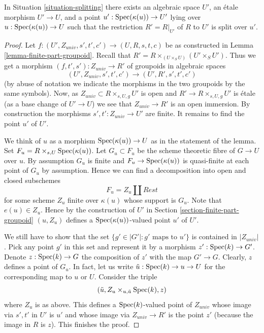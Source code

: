 \begin{lemma}
\label{lemma-splitting}
In Situation \ref{situation-splitting}
there exists an algebraic space $U'$, an \'etale morphism
$U' \to U$, and a point $u' : \mathop{\mathrm{Spec}}(\kappa(u)) \to U'$
lying over $u : \mathop{\mathrm{Spec}}(\kappa(u)) \to U$
such that the restriction $R' = R|_{U'}$ of $R$ to $U'$
is split over $u'$.
\end{lemma}

\begin{proof}
Let $f : (U', Z_{univ}, s', t', c') \to (U, R, s, t, c)$ be as constructed in
Lemma \ref{lemma-finite-part-groupoid}.
Recall that $R' = R \times_{(U \times_S U)} (U' \times_S U')$.
Thus we get a morphism $(f, t', s') : Z_{univ} \to R'$ of groupoids
in algebraic spaces
$$
(U', Z_{univ}, s', t', c') \to (U', R', s', t', c')
$$
(by abuse of notation we indicate the morphisms in the two groupoids
by the same symbols). Now, as $Z_{univ} \subset R \times_{s, U, g} U'$ is open
and $R' \to R \times_{s, U, g} U'$ is \'etale (as a base change
of $U' \to U$) we see that $Z_{univ} \to R'$ is an open immersion.
By construction the morphisms $s', t' : Z_{univ} \to U'$ are finite.
It remains to find the point $u'$ of $U'$.

\medskip\noindent
We think of $u$ as a morphism $\mathop{\mathrm{Spec}}(\kappa(u)) \to U$ as in
the statement of the lemma. Set $F_u = R \times_{s, U} \mathop{\mathrm{Spec}}(\kappa(u))$.
Let $G_u \subset F_u$ be the scheme theoretic fibre of $G \to U$ over $u$.
By assumption $G_u$ is finite and $F_u \to \mathop{\mathrm{Spec}}(\kappa(u))$
is quasi-finite at each point of $G_u$ by assumption.
Hence we can find a decomposition into open and closed subschemes
$$
F_u = Z_u \amalg Rest
$$
for some scheme $Z_u$ finite over $\kappa(u)$ whose support is $G_u$.
Note that $e(u) \in Z_u$. Hence by the construction of $U'$ in
Section \ref{section-finite-part-groupoid}
$(u, Z_u)$ defines a $\mathop{\mathrm{Spec}}(\kappa(u))$-valued
point $u'$ of $U'$.

\medskip\noindent
We still have to show that the set $\{g' \in |G'| : g'\text{ maps to }u'\}$
is contained in $|Z_{univ}|$. Pick any point $g'$ in this set and
represent it by a morphism $z' : \mathop{\mathrm{Spec}}(k) \to G'$. Denote
$z : \mathop{\mathrm{Spec}}(k) \to G$ the composition of $z'$ with the map $G' \to G$.
Clearly, $z$ defines a point of $G_u$. In fact, let us write
$\tilde u : \mathop{\mathrm{Spec}}(k) \to u \to U$ for the corresponding map to $u$ or $U$.
Consider the triple
$$
(\tilde u, Z_u \times_{u, \tilde u} \mathop{\mathrm{Spec}}(k), z)
$$
where $Z_u$ is as above. This defines a $\mathop{\mathrm{Spec}}(k)$-valued point
of $Z_{univ}$ whose image via $s', t'$ in $U'$ is $u'$ and
whose image via $Z_{univ} \to R'$ is the point $z'$
(because the image in $R$ is $z$).
This finishes the proof.
\end{proof}

